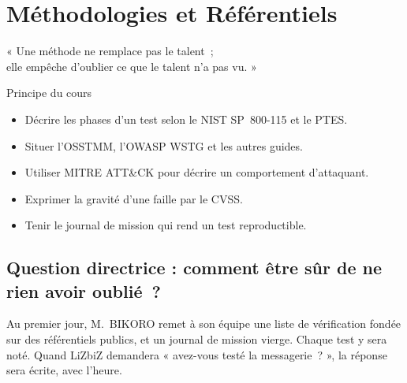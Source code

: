 
\chapter{Méthodologies et Référentiels}
\label{chap:methodes}

\epigraph{%
    « Une méthode ne remplace pas le talent~;\\
    elle empêche d'oublier ce que le talent n'a pas vu. »%
}{Principe du cours}


\begin{boxobjectifs}
\begin{itemize}
    \item Décrire les phases d'un test selon le NIST SP~800-115 et le PTES.
    \item Situer l'OSSTMM, l'OWASP WSTG et les autres guides.
    \item Utiliser MITRE ATT\&CK pour décrire un comportement d'attaquant.
    \item Exprimer la gravité d'une faille par le CVSS.
    \item Tenir le journal de mission qui rend un test reproductible.
\end{itemize}
\end{boxobjectifs}

\bigskip

\section*{Question directrice : comment être sûr de ne rien avoir oublié~?}

Au premier jour, M.~BIKORO remet à son équipe une liste de vérification
fondée sur des référentiels publics, et un journal de mission vierge.
Chaque test y sera noté. Quand LiZbiZ demandera « avez-vous testé la
messagerie~? », la réponse sera écrite, avec l'heure.

